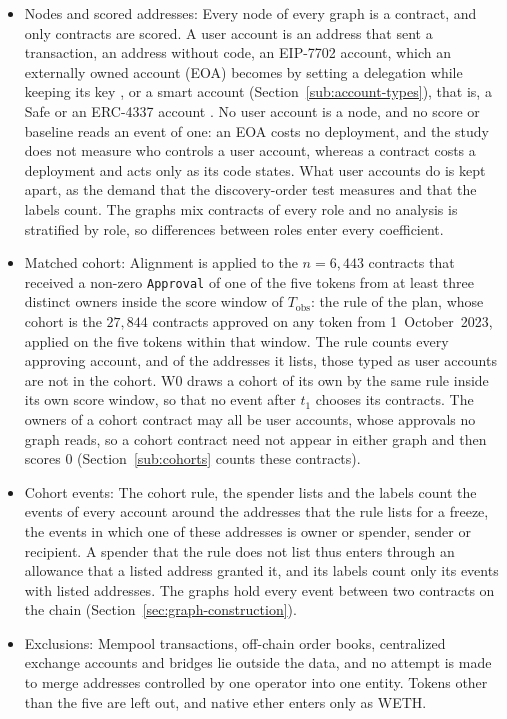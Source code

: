 \begin{itemize}
\item Nodes and scored addresses: Every node of every graph is a contract, and only contracts are scored. A user account is an address that sent a transaction, an address without code, an EIP-7702 account, which an externally owned account (EOA) becomes by setting a delegation while keeping its key \parencite{buterin2024eip7702}, or a smart account (Section~\ref{sub:account-types}), that is, a Safe \parencite{safenddocs} or an ERC-4337 account \parencite{buterin2021erc4337}. No user account is a node, and no score or baseline reads an event of one: an EOA costs no deployment, and the study does not measure who controls a user account, whereas a contract costs a deployment and acts only as its code states. What user accounts do is kept apart, as the demand that the discovery-order test measures and that the labels count. The graphs mix contracts of every role and no analysis is stratified by role, so differences between roles enter every coefficient.

\item Matched cohort: Alignment is applied to the $n=6{,}443$ contracts that received a non-zero \texttt{Approval} of one of the five tokens from at least three distinct owners inside the score window of $T_{\mathrm{obs}}$: the rule of the plan, whose cohort is the $27{,}844$ contracts approved on any token from 1~October~2023, applied on the five tokens within that window. The rule counts every approving account, and of the addresses it lists, those typed as user accounts are not in the cohort. W0 draws a cohort of its own by the same rule inside its own score window, so that no event after $t_1$ chooses its contracts. The owners of a cohort contract may all be user accounts, whose approvals no graph reads, so a cohort contract need not appear in either graph and then scores $0$ (Section~\ref{sub:cohorts} counts these contracts).

\item Cohort events: The cohort rule, the spender lists and the labels count the events of every account around the addresses that the rule lists for a freeze, the events in which one of these addresses is owner or spender, sender or recipient. A spender that the rule does not list thus enters through an allowance that a listed address granted it, and its labels count only its events with listed addresses. The graphs hold every event between two contracts on the chain (Section~\ref{sec:graph-construction}).

\item Exclusions: Mempool transactions, off-chain order books, centralized exchange accounts and bridges lie outside the data, and no attempt is made to merge addresses controlled by one operator into one entity. Tokens other than the five are left out, and native ether enters only as WETH.

\end{itemize}

